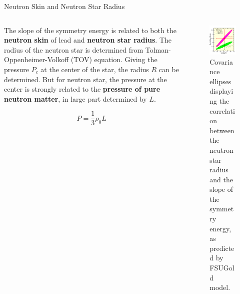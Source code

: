 \documentclass[9pt,a4paper]{beamer}
\begin{document}
\begin{frame}{Neutron Skin and Neutron Star Radius}
\begin{columns}[T]
\begin{column}{.5\textwidth}
The slope of the symmetry energy is related to both the \textbf{neutron skin} of lead and \textbf{neutron star radius}. The radius of the neutron star is determined from Tolman-Oppenheimer-Volkoff (TOV) equation.
 Giving the pressure $P_{c}$ at the center of the star, the radius $R$ can be determined. But for neutron star, the pressure at the center is strongly related to the \textbf{pressure of pure neutron matter}, in large part determined by $L$.
 
 \begin{equation}
 P = \frac{1}{3} \rho_{0} L
 \end{equation}
\end{column}
\begin{column}{.5\textwidth}
\begin{figure}
\centering
\includegraphics[scale=0.50]{figures/LvsRns.pdf}
\caption{Covariance ellipses displaying the correlation between the neutron star radius and the slope of the symmetry energy, as predicted by FSUGold model.}
\end{figure}
\end{column}
\end{columns}
\end{frame}
\end{document}
